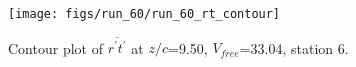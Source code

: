 \begin{figure}[H]
\centering
\texttt{[image: figs/run\_60/run\_60\_rt\_contour]}
\caption{Contour plot of $\overline{r^\prime t^\prime}$ at $z/c$=9.50, $V_{free}$=33.04, station 6.}
\label{fig:run_60_rt_contour}
\end{figure}


